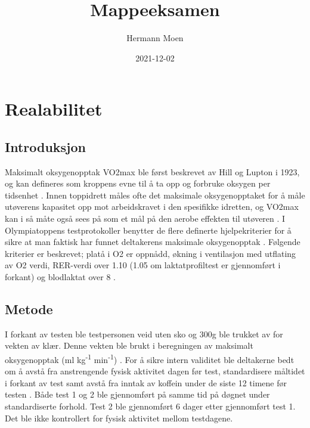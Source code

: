 \documentclass[
]{book}
\title{Mappeeksamen}
\author{Hermann Moen}
\date{2021-12-02}
\begin{document}
\maketitle

{
\setcounter{tocdepth}{1}
\tableofcontents
}
\hypertarget{realabilitet}{%
\chapter{Realabilitet}\label{realabilitet}}

\hypertarget{introduksjon}{%
\section{Introduksjon}\label{introduksjon}}

Maksimalt oksygenopptak VO2max ble først beskrevet av Hill og Lupton i 1923, og kan defineres som kroppens evne til å ta opp og forbruke oksygen per tidsenhet \citep{bassett2000, hill1923}. Innen toppidrett måles ofte det maksimale oksygenopptaket for å måle utøverens kapasitet opp mot arbeidskravet i den spesifikke idretten, og VO2max kan i så måte også sees på som et mål på den aerobe effekten til utøveren \citep{bassett2000}. I Olympiatoppens testprotokoller benytter de flere definerte hjelpekriterier for å sikre at man faktisk har funnet deltakerens maksimale oksygenopptak \citep{tønnessen2017}. Følgende kriterier er beskrevet; platå i O2 er oppnådd, økning i ventilasjon med utflating av O2 verdi, RER-verdi over 1.10 (1.05 om laktatprofiltest er gjennomført i forkant) og blodlaktat over 8 \citep{tønnessen2017}.

\hypertarget{metode}{%
\section{Metode}\label{metode}}

I forkant av testen ble testpersonen veid uten sko og 300g ble trukket av for vekten av klær. Denne vekten ble brukt i beregningen av maksimalt oksygenopptak (ml kg\textsuperscript{-1} min\textsuperscript{-1}) . For å sikre intern validitet ble deltakerne bedt om å avstå fra anstrengende fysisk aktivitet dagen før test, standardisere måltidet i forkant av test samt avstå fra inntak av koffein under de siste 12 timene før testen \citep{halperin2015}. Både test 1 og 2 ble gjennomført på samme tid på døgnet under standardiserte forhold. Test 2 ble gjennomført 6 dager etter gjennomført test 1. Det ble ikke kontrollert for fysisk aktivitet mellom testdagene.
\end{document}
